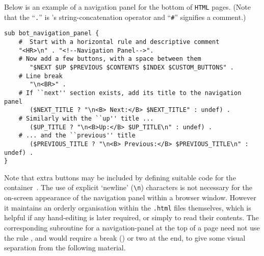 \html{\\}\noindent
Below is an example of a navigation panel for the bottom of \texttt{HTML} pages.
(Note that the ``\texttt{.}'' is \Perl{}'s string-concatenation operator 
and ``\texttt{\#}'' signifies a comment.)
\begin{small}
\begin{verbatim}
sub bot_navigation_panel {
    #  Start with a horizontal rule and descriptive comment
    "<HR>\n" . "<!--Navigation Panel-->".
    # Now add a few buttons, with a space between them
       "$NEXT $UP $PREVIOUS $CONTENTS $INDEX $CUSTOM_BUTTONS" . 
    # Line break    
       "\n<BR>" .       
    # If ``next'' section exists, add its title to the navigation panel
       ($NEXT_TITLE ? "\n<B> Next:</B> $NEXT_TITLE" : undef) .   
    # Similarly with the ``up'' title ...
       ($UP_TITLE ? "\n<B>Up:</B> $UP_TITLE\n" : undef) . 
    # ... and the ``previous'' title
       ($PREVIOUS_TITLE ? "\n<B> Previous:</B> $PREVIOUS_TITLE\n" : undef) . 
}
\end{verbatim}
\end{small}
Note that extra buttons may be included by defining suitable code for the container
\,. 
The use of explicit `newline' (\verb|\n|) characters is not necessary for the
on-screen appearance of the navigation panel within a browser window. However 
it maintains an orderly organisation within the \texttt{.html} files themselves,
which is helpful if any hand-editing is later required, 
or simply to read their contents.
The corresponding subroutine for a navigation-panel at the top of a page
need not use the rule , and would require a break ()
or two at the end, to give some visual separation from the following material.




